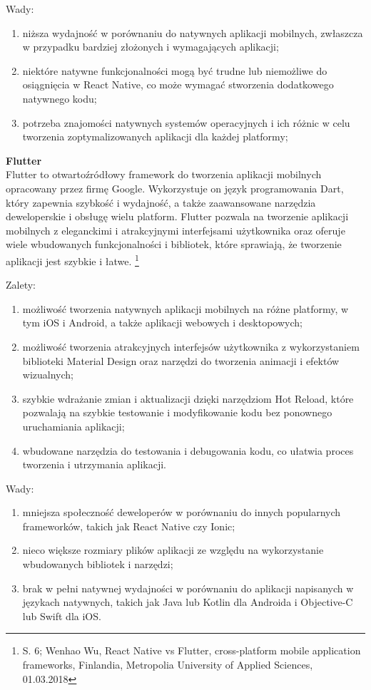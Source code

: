\documentclass[12pt, a4paper, twoside, openany]{book}
\begin{document}
Wady:
\begin{enumerate}[label=--]
    \item niższa wydajność w porównaniu do natywnych aplikacji mobilnych, zwłaszcza w przypadku bardziej złożonych i wymagających aplikacji;
    \item niektóre natywne funkcjonalności mogą być trudne lub niemożliwe do osiągnięcia w React Native, co może wymagać stworzenia dodatkowego natywnego kodu;
    \item potrzeba znajomości natywnych systemów operacyjnych i ich różnic w celu tworzenia zoptymalizowanych aplikacji dla każdej platformy;
\end{enumerate}

\textbf{Flutter\\}
\indent Flutter to otwartoźródłowy framework do tworzenia aplikacji mobilnych opracowany przez firmę Google. Wykorzystuje on język programowania Dart, który zapewnia szybkość i wydajność, a także zaawansowane narzędzia deweloperskie i obsługę wielu platform. Flutter pozwala na tworzenie aplikacji mobilnych z eleganckimi i atrakcyjnymi interfejsami użytkownika oraz oferuje wiele wbudowanych funkcjonalności i bibliotek, które sprawiają, że tworzenie aplikacji jest szybkie i łatwe. \footnote{S. 6; Wenhao Wu, React Native vs Flutter, cross-platform mobile application frameworks, Finlandia, Metropolia University of Applied Sciences, 01.03.2018}

Zalety:
\begin{enumerate}[label=--]
    \item możliwość tworzenia natywnych aplikacji mobilnych na różne platformy, w tym iOS i Android, a także aplikacji webowych i desktopowych;
    \item możliwość tworzenia atrakcyjnych interfejsów użytkownika z wykorzystaniem biblioteki Material Design oraz narzędzi do tworzenia animacji i efektów wizualnych;
    \item szybkie wdrażanie zmian i aktualizacji dzięki narzędziom Hot Reload, które pozwalają na szybkie testowanie i modyfikowanie kodu bez ponownego uruchamiania aplikacji;
    \item wbudowane narzędzia do testowania i debugowania kodu, co ułatwia proces tworzenia i utrzymania aplikacji.
\end{enumerate}

Wady:
\begin{enumerate}[label=--]
    \item mniejsza społeczność deweloperów w porównaniu do innych popularnych frameworków, takich jak React Native czy Ionic;
    \item nieco większe rozmiary plików aplikacji ze względu na wykorzystanie wbudowanych bibliotek i narzędzi;
    \item brak w pełni natywnej wydajności w porównaniu do aplikacji napisanych w językach natywnych, takich jak Java lub Kotlin dla Androida i Objective-C lub Swift dla iOS.
\end{enumerate}
\end{document}

